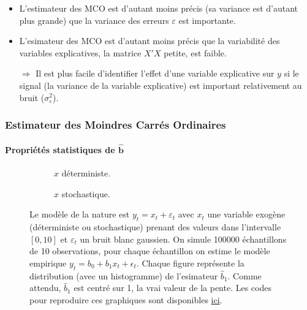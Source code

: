 \documentclass[10pt]{beamer}
\theoremstyle{plain}
\begin{document}
\begin{notes}
  \begin{itemize}
  \item L'estimateur des MCO est d'autant moins précis (sa variance est d'autant plus grande) que la variance des erreurs $\varepsilon$ est importante.\newline

  \item L'esimateur des MCO est d'autant moins précis que la variabilité des variables explicatives, la matrice $X'X$ \guillemotleft petite\guillemotright, est faible.\newline

  \item[$\Rightarrow$] Il est plus facile d'identifier l'effet d'une variable explicative sur $y$ si le signal (la variance de la variable explicative) est important relativement au bruit ($\sigma_{\varepsilon}^2$).
  \end{itemize}

\end{notes}


\begin{frame}
  \frametitle{Estimateur des Moindres Carrés Ordinaires}
  \framesubtitle {Propriétés statistiques de $\hat{\mathbf b}$}

  \begin{figure}
    \centering
    \begin{subfigure}{0.4\textwidth}
      \scalebox{.3}{
    }
    \caption{$x$ déterministe.}
    \label{fig:01:a}
  \end{subfigure}
  \hfill
  \begin{subfigure}{0.4\textwidth}
    \scalebox{.3}{
    }
    \caption{$x$ stochastique.}
    \label{fig:01:b}
  \end{subfigure}
  \label{fig:01}
  \caption{Le modèle de la nature est $y_t = x_t + \varepsilon_t$ avec $x_t$ une variable exogène (déterministe ou stochastique) prenant des valeurs dans l'intervalle $[0,10]$ et $\varepsilon_t$ un bruit blanc gaussien. On simule 100000  échantillons de 10 observations, pour chaque échantillon on estime le modèle empirique $y_t = b_0 + b_1 x_t + \epsilon_t$. Chaque figure représente la distribution (avec un histogramme) de l'esimateur $\hat b_1$. Comme attendu,  $\hat b_1$ est centré sur 1, la vrai valeur de la pente.  Les codes pour reproduire ces graphiques sont disponibles \href{https://mnemosyne.ithaca.fr/stephane/econometrics/-/blob/\HEAD/cours/codes/chapitre-1/estimator-with-deterministic-versus-stochastic-samples.py}{ici}.}
\end{figure}
\end{frame}
\end{document}
